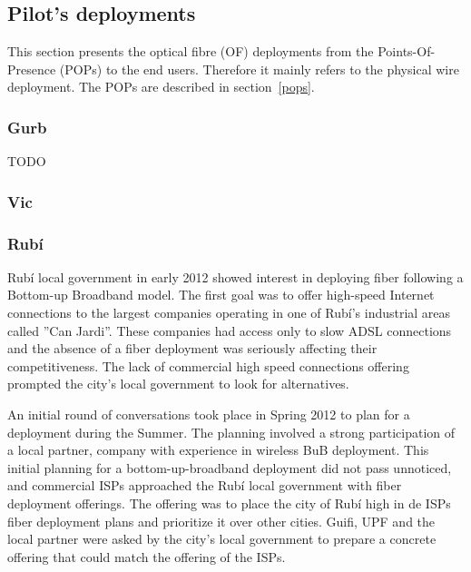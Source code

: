 
\subsection{Pilot's deployments}

This section presents the optical fibre (OF) deployments from the Points-Of-Presence (POPs) to the end users. Therefore it mainly refers to the physical wire deployment. The POPs are described in section~\ref{pops}.

\subsubsection{Gurb}

TODO

\subsubsection{Vic}




\subsubsection{Rub\'{i}}

Rub\'{i} local government in early 2012 showed interest in deploying fiber following a Bottom-up Broadband model.
The first goal was to offer high-speed Internet connections to the largest companies operating in one of Rub\'{i}'s industrial areas called ''Can Jardi''.
These companies had access only to slow ADSL connections and the absence of a fiber deployment was seriously affecting their competitiveness.
The lack of commercial high speed connections offering prompted the city's local government to look for alternatives.

An initial round of conversations took place in Spring 2012 to plan for a deployment during the Summer.
The planning involved a strong participation of a local partner, company with experience in wireless BuB deployment.
This initial planning for a bottom-up-broadband deployment did not pass unnoticed, and commercial ISPs approached the Rub\'{i} local government with fiber deployment offerings.
The offering was to place the city of Rub\'{i} high in de ISPs fiber deployment plans and prioritize it over other cities.
Guifi, UPF and the local partner were asked by the city's local government to prepare a concrete offering that could match the offering of the ISPs.

